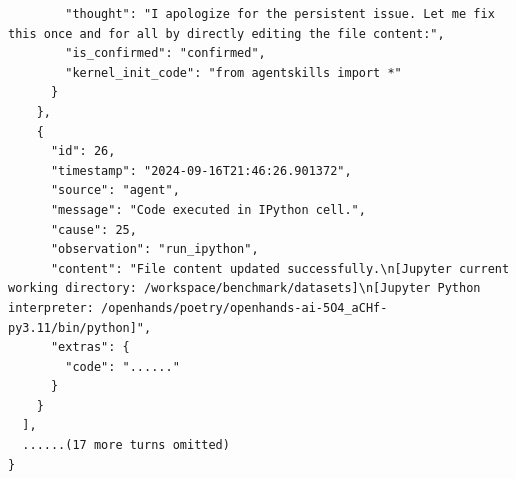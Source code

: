 \begin{lstlisting}
        "thought": "I apologize for the persistent issue. Let me fix this once and for all by directly editing the file content:",
        "is_confirmed": "confirmed",
        "kernel_init_code": "from agentskills import *"
      }
    },
    {
      "id": 26,
      "timestamp": "2024-09-16T21:46:26.901372",
      "source": "agent",
      "message": "Code executed in IPython cell.",
      "cause": 25,
      "observation": "run_ipython",
      "content": "File content updated successfully.\n[Jupyter current working directory: /workspace/benchmark/datasets]\n[Jupyter Python interpreter: /openhands/poetry/openhands-ai-5O4_aCHf-py3.11/bin/python]",
      "extras": {
        "code": "......"
      }
    }
  ],
  ......(17 more turns omitted)
}
\end{lstlisting}